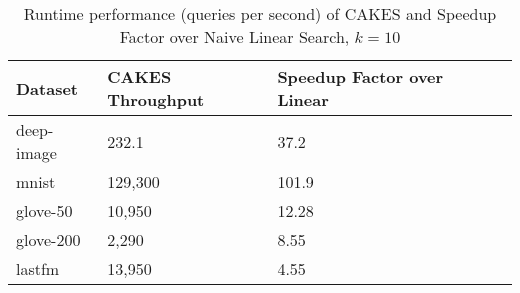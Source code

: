 \begin{table*}[!t]
    \caption{Runtime performance (queries per second) of CAKES and Speedup Factor over Naive Linear Search, $k=10$}
    \label{table:results:ann-alt-10}
    \vskip 0.15in
    \begin{center}
        \begin{small}
            \begin{sc}
                \begin{tabular}{|l|l|l|l|l|}
                    \hline
                    \textbf{Dataset} & \textbf{CAKES Throughput} & \textbf{Speedup Factor over Linear} \\
                    \hline
                    deep-image       & 232.1                     & 37.2      \\
                    \hline
                    mnist            & 129,300                   & 101.9      \\
                    \hline
                    glove-50         & 10,950                    & 12.28      \\
                    \hline 
                    glove-200        & 2,290                     & 8.55     \\
                    \hline
                    lastfm           & 13,950                    & 4.55           \\
                    \hline
                \end{tabular}
            \end{sc}
        \end{small}
    \end{center}
    \vskip -0.1in
\end{table*}


